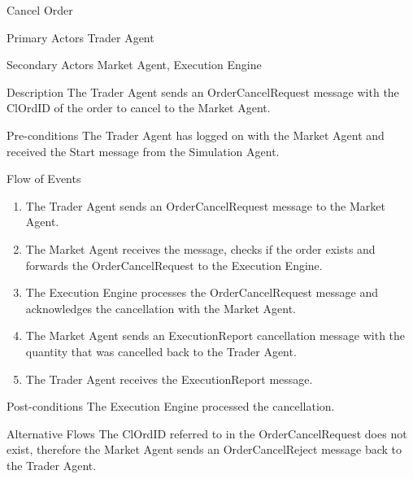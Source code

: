 \begin{usecase}{Cancel Order}
\item[Primary Actors] Trader Agent
\item[Secondary Actors] Market Agent, Execution Engine
\item[Description] The Trader Agent sends an OrderCancelRequest message with the ClOrdID of the order to cancel to the Market Agent.
\item[Pre-conditions] The Trader Agent has logged on with the Market Agent and received the Start message from the Simulation Agent.
\item[Flow of Events] 
\begin{enumerate}
\item The Trader Agent sends an OrderCancelRequest message to the Market Agent.
\item The Market Agent receives the message, checks if the order exists and forwards the OrderCancelRequest to the Execution Engine.
\item The Execution Engine processes the OrderCancelRequest message and acknowledges the cancellation with the Market Agent.
\item The Market Agent sends an ExecutionReport cancellation message with the quantity that was cancelled back to the Trader Agent.
\item The Trader Agent receives the ExecutionReport message.
\end{enumerate}
\item[Post-conditions] The Execution Engine processed the cancellation.
\item[Alternative Flows] The ClOrdID referred to in the OrderCancelRequest does not exist, therefore the Market Agent sends an OrderCancelReject message back to the Trader Agent.
\end{usecase}

